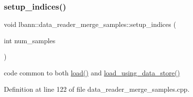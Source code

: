 \subsubsection{\texorpdfstring{setup\+\_\+indices()}{setup\_indices()}}
{\footnotesize\ttfamily void lbann\+::data\+\_\+reader\+\_\+merge\+\_\+samples\+::setup\+\_\+indices (\begin{DoxyParamCaption}\item[{int}]{num\+\_\+samples }\end{DoxyParamCaption})\hspace{0.3cm}{\ttfamily [protected]}}



code common to both \hyperlink{classlbann_1_1data__reader__merge__samples_ab3554341417f5eba95b9c1098af40410}{load()} and \hyperlink{classlbann_1_1data__reader__merge__samples_ad45275b73fcbca47b74a9c9767f69bc9}{load\+\_\+using\+\_\+data\+\_\+store()} 



Definition at line 122 of file data\+\_\+reader\+\_\+merge\+\_\+samples.\+cpp.


